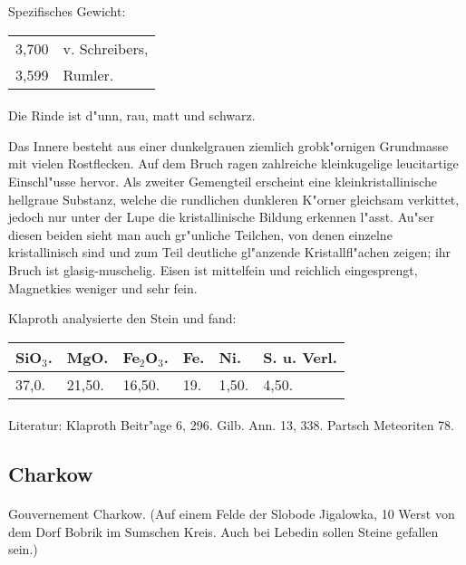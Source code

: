 \documentclass[a4paper, 11pt, oneside]{article}
\begin{document}
Spezifisches Gewicht:
\begin{table}[!ht]
    \centering
    \begin{tabular}{l l}
        3,700 & v. Schreibers,\\
        3,599 & Rumler.
    \end{tabular}
\end{table}
\paragraph{}
Die Rinde ist d"unn, rau, matt und schwarz.

Das Innere besteht aus einer dunkelgrauen ziemlich grobk"ornigen Grundmasse mit vielen Rostflecken. Auf dem Bruch ragen zahlreiche kleinkugelige leucitartige Einschl"usse hervor. Als zweiter Gemengteil erscheint eine kleinkristallinische hellgraue Substanz, welche die rundlichen dunkleren K"orner gleichsam verkittet, jedoch nur unter der Lupe die kristallinische Bildung erkennen l"asst. Au"ser diesen beiden sieht man auch gr"unliche Teilchen, von denen einzelne kristallinisch sind und zum Teil deutliche gl"anzende Kristallfl"achen zeigen; ihr Bruch ist glasig-muschelig. Eisen ist mittelfein und reichlich eingesprengt, Magnetkies weniger und sehr fein.

Klaproth analysierte den Stein und fand:
\begin{table}[!ht]
    \centering
    \begin{tabular}{l l l l l l}
        SiO$_{3}$. & MgO. & Fe$_{2}$O$_{3}$. & Fe. & Ni. & S. u. Verl. \\ \hline
        37,0. & 21,50. & 16,50. & 19. & 1,50. & 4,50. \\
    \end{tabular}
\end{table}
\footnotesize
\paragraph{}
Literatur: Klaproth Beitr"age 6, 296. Gilb. Ann. 13, 338. Partsch Meteoriten 78.
\subsection{Charkow}
\normalsize
\paragraph{}
Gouvernement Charkow. (Auf einem Felde der Slobode Jigalowka, 10 Werst von dem Dorf Bobrik im Sumschen Kreis. Auch bei Lebedin sollen Steine gefallen sein.)
\end{document}
